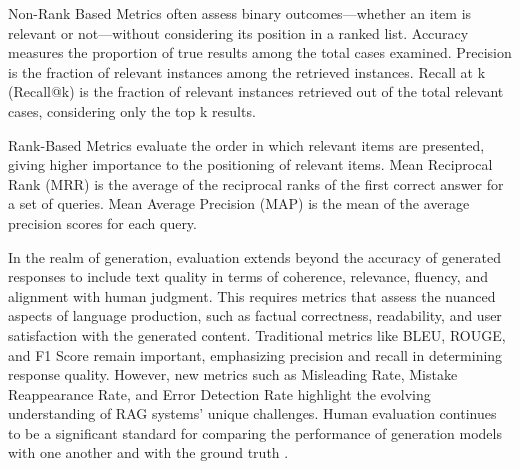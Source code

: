 Non-Rank Based Metrics often assess binary outcomes—whether an item is relevant or not—without considering its position in a ranked list. Accuracy measures the proportion of true results among the total cases examined. Precision is the fraction of relevant instances among the retrieved instances. Recall at k (Recall@k) is the fraction of relevant instances retrieved out of the total relevant cases, considering only the top k results.

Rank-Based Metrics evaluate the order in which relevant items are presented, giving higher importance to the positioning of relevant items. Mean Reciprocal Rank (MRR) is the average of the reciprocal ranks of the first correct answer for a set of queries. Mean Average Precision (MAP) is the mean of the average precision scores for each query.

In the realm of generation, evaluation extends beyond the accuracy of generated responses to include text quality in terms of coherence, relevance, fluency, and alignment with human judgment. This requires metrics that assess the nuanced aspects of language production, such as factual correctness, readability, and user satisfaction with the generated content. Traditional metrics like BLEU, ROUGE, and F1 Score remain important, emphasizing precision and recall in determining response quality. However, new metrics such as Misleading Rate, Mistake Reappearance Rate, and Error Detection Rate highlight the evolving understanding of RAG systems’ unique challenges. Human evaluation continues to be a significant standard for comparing the performance of generation models with one another and with the ground truth \cite{Yu.13May2024}.